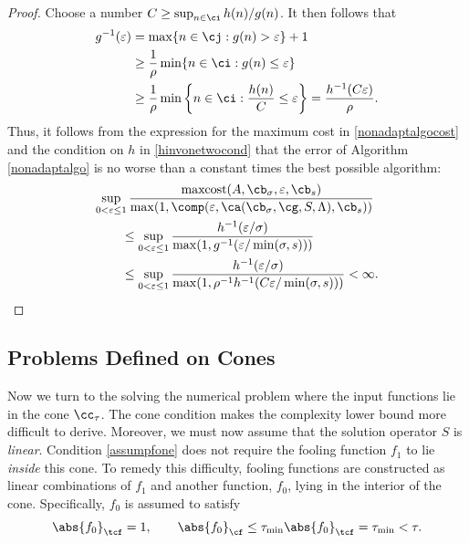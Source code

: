 \documentclass[]{elsarticle}
\DeclareMathOperator{\maxcost}{maxcost}
\theoremstyle{definition}
\theoremstyle{remark}
\newcommand{\Fnorm}[1]{\abs{#1}_{\cf}}
\newcommand{\Ftnorm}[1]{\abs{#1}_{\tcf}}
\begin{document}
\begin{proof}  Choose a number $C \ge \sup_{n \in \ci} h(n)/g(n)$.  It then follows that
\begin{align*}
g^{-1}(\varepsilon) &= \max \{ n \in \cj : g(n) > \varepsilon\}+1 \\ 
& \ge \frac{1}{\rho}\min\{ n \in \ci : g(n) \le \varepsilon\}  \\
& \ge \frac{1}{\rho} \min \left \{ n \in \ci : \frac{h(n)}{C} \le \varepsilon \right\} = \frac{h^{-1}(C \varepsilon)}{\rho}.
\end{align*}
Thus, it follows from the expression for the maximum cost in \eqref{nonadaptalgocost} and the condition on $h$ in \eqref{hinvonetwocond} that the error of Algorithm \ref{nonadaptalgo} is no worse than a constant times the best possible algorithm:
\begin{align*}
\MoveEqLeft{\sup_{0 < \varepsilon \le 1} \frac{\maxcost(A,\cb_{\sigma},\varepsilon,\cb_{s})}
{\max(1,\comp(\varepsilon,\ca(\cb_{\sigma},\cg,S,\Lambda),\cb_s))}} \\
& \le \sup_{0 < \varepsilon \le 1} \frac{h^{-1}(\varepsilon/\sigma)} {\max(1,g^{-1}(\varepsilon/\min(\sigma,s)))} \\
& \le \sup_{0 < \varepsilon \le 1} \frac{h^{-1}(\varepsilon/\sigma)} {\max(1,\rho^{-1} h^{-1}(C\varepsilon/\min(\sigma,s)))} <\infty.
\end{align*}
\end{proof}

\subsection{Problems Defined on Cones} \label{coneoptsubsec}

Now we turn to the solving the numerical problem where the input functions lie in the cone $\cc_{\tau}$.  The cone condition makes the complexity lower bound more difficult to derive.  Moreover, we must now assume that the solution operator $S$ is \emph{linear}.  Condition \eqref{assumpfone} does not require the fooling function $f_1$ to lie \emph{inside} this cone.  To remedy this difficulty, fooling functions are constructed as linear combinations of $f_1$ and another function, $f_0$, lying in the interior of the cone.  Specifically, $f_0$ is assumed to satisfy
\begin{equation}
\label{assumpfzero}
\Ftnorm{f_{0}} = 1, \qquad \Fnorm{f_{0}} \le \tau_{\min} \Ftnorm{f_{0}} = \tau_{\min} < \tau.
\end{equation}
\end{document}
